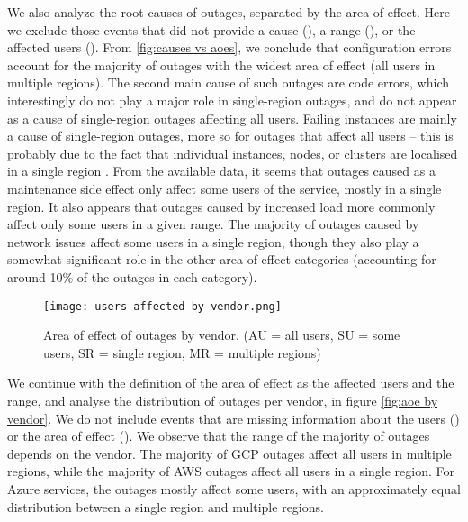 We also analyze the root causes of outages, separated by the area of effect.
Here we exclude those events that did not provide a cause (), a range (), or the affected users ().
From \autoref{fig:causes vs aoes}, we conclude that configuration errors account for the majority of outages with the widest area of effect (all users in multiple regions).
The second main cause of such outages are code errors, which interestingly do not play a major role in single-region outages, and do not appear as a cause of single-region outages affecting all users.
Failing instances are mainly a cause of single-region outages, more so for outages that affect all users -- this is probably due to the fact that individual instances, nodes, or clusters are localised in a single region \cite{awsRegionDocs}.
From the available data, it seems that outages caused as a maintenance side effect only affect some users of the service, mostly in a single region.
It also appears that outages caused by increased load more commonly affect only some users in a given range.
The majority of outages caused by network issues affect some users in a single region, though they also play a somewhat significant role in the other area of effect categories (accounting for around 10\% of the outages in each category).

\begin{figure}[h]
  \centering
  \texttt{[image: users-affected-by-vendor.png]}
  \caption{Area of effect of outages by vendor. (AU = all users, SU = some users, SR = single region, MR = multiple regions)}
  \label{fig:aoe by vendor}
\end{figure}

We continue with the definition of the area of effect as the affected users and the range, and analyse the distribution of outages per vendor, in figure \autoref{fig:aoe by vendor}.
We do not include events that are missing information about the users () or the area of effect ().
We observe that the range of the majority of outages depends on the vendor.
The majority of GCP outages affect all users in multiple regions, while the majority of AWS outages affect all users in a single region.
For Azure services, the outages mostly affect some users, with an approximately equal distribution between a single region and multiple regions.

